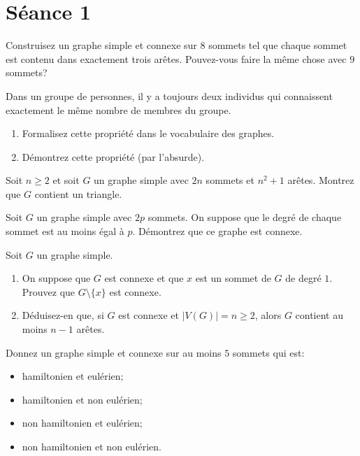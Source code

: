 
\section{Séance 1}

\begin{exo}
Construisez un graphe simple et connexe sur $8$ sommets tel que chaque sommet est contenu dans exactement trois ar\^etes. Pouvez-vous faire la m\^eme chose avec $9$ sommets?
\end{exo}

\begin{exo}
Dans un groupe de personnes, il y a toujours deux individus qui connaissent exactement le m\^eme nombre de membres du groupe.
\begin{enumerate}
\item Formalisez cette propri\'et\'e dans le vocabulaire des graphes.
\item D\'emontrez cette propri\'et\'e (par l'absurde).
\end{enumerate}
\end{exo}

\begin{exo}
Soit $n\geq 2$ et soit $G$ un graphe simple avec $2n$ sommets et $n^2+1$ ar\^etes. Montrez que $G$ contient un triangle.
\end{exo}

\begin{exo}
Soit $G$ un graphe simple avec $2p$ sommets. On suppose que le degr\'e de chaque sommet est au moins \'egal \`a $p$. D\'emontrez que ce graphe est connexe.
\end{exo}

\begin{exo}
Soit $G$ un graphe simple.
\begin{enumerate}
\item On suppose que $G$ est connexe et que $x$ est un sommet de $G$ de degr\'e $1$. Prouvez que $G\setminus\{x\}$ est connexe.
\item D\'eduisez-en que, si $G$ est connexe et $|V(G)|=n\geq 2$, alors $G$ contient au moins $n-1$ ar\^etes.
\end{enumerate}
\end{exo}

\begin{exo}
Donnez un graphe simple et connexe sur au moins $5$ sommets qui est:
\begin{itemize}
\item hamiltonien et eul\'erien;
\item hamiltonien et non eul\'erien;
\item non hamiltonien et eul\'erien;
\item non hamiltonien et non eul\'erien.
\end{itemize}
\end{exo}

